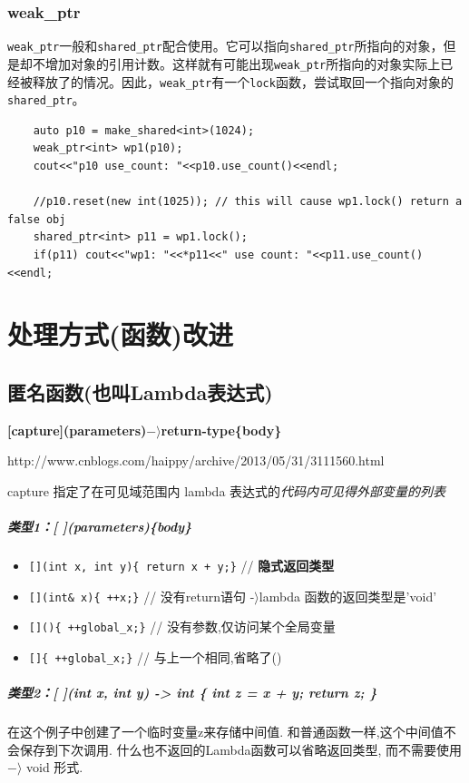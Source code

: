 \documentclass[UTF8,a4paper,12pt]{ctexbook} %
\begin{document}
			\subsubsection{weak\_ptr}\verb|weak_ptr|一般和\verb|shared_ptr|配合使用。它可以指向\verb|shared_ptr|所指向的对象，但是却不增加对象的引用计数。这样就有可能出现\verb|weak_ptr|所指向的对象实际上已经被释放了的情况。因此，\verb|weak_ptr|有一个\verb|lock|函数，尝试取回一个指向对象的\verb|shared_ptr|。
				\begin{lstlisting}
	auto p10 = make_shared<int>(1024);
	weak_ptr<int> wp1(p10);
	cout<<"p10 use_count: "<<p10.use_count()<<endl;
	
	//p10.reset(new int(1025)); // this will cause wp1.lock() return a false obj
	shared_ptr<int> p11 = wp1.lock();
	if(p11) cout<<"wp1: "<<*p11<<" use count: "<<p11.use_count()<<endl;
				\end{lstlisting}
	\section{处理方式(函数)改进}
		\subsection{匿名函数(也叫Lambda表达式)}
		
			\textbf{	[capture](parameters)$- \rangle$return-type\{body\}}
			
			http://www.cnblogs.com/haippy/archive/2013/05/31/3111560.html
			
			capture 指定了在可见域范围内 lambda 表达式的\textit{代码内可见得外部变量的列表}
			
			\subparagraph{类型1：[ ](parameters)\{body\}}
			\begin{itemize}
				\item  \verb|[](int x, int y){ return x + y;}| // \textbf{隐式返回类型}
				\item  \verb|[](int& x){ ++x;}|   // 没有return语句 -$\rangle$lambda 函数的返回类型是'void'
				\item  \verb|[](){ ++global_x;}|  // 没有参数,仅访问某个全局变量
				\item  \verb|[]{ ++global_x;}|     // 与上一个相同,省略了()
			\end{itemize}
			
			\subparagraph{类型2：[ ](int x, int y) -> int \{ int z = x + y; return z; \}}在这个例子中创建了一个临时变量z来存储中间值. 和普通函数一样,这个中间值不会保存到下次调用. 什么也不返回的Lambda函数可以省略返回类型, 而不需要使用 $- \rangle$ void 形式.
			
\end{document}

